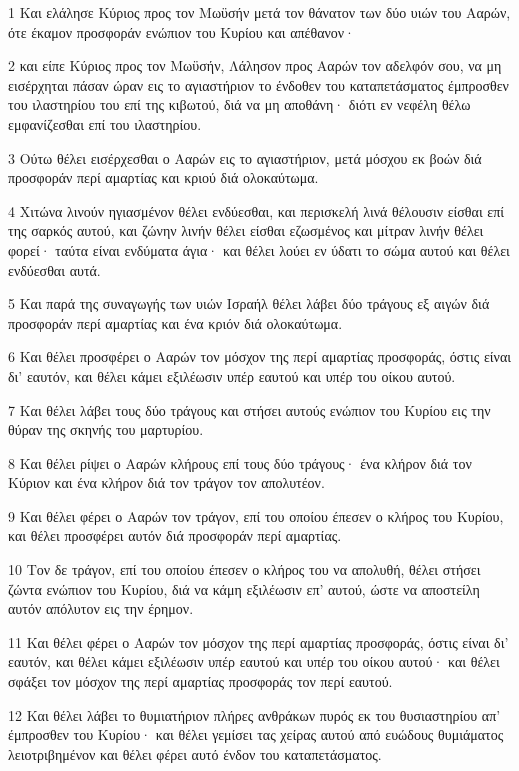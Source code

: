 \par 1 Και ελάλησε Κύριος προς τον Μωϋσήν μετά τον θάνατον των δύο υιών του Ααρών, ότε έκαμον προσφοράν ενώπιον του Κυρίου και απέθανον·
\par 2 και είπε Κύριος προς τον Μωϋσήν, Λάλησον προς Ααρών τον αδελφόν σου, να μη εισέρχηται πάσαν ώραν εις το αγιαστήριον το ένδοθεν του καταπετάσματος έμπροσθεν του ιλαστηρίου του επί της κιβωτού, διά να μη αποθάνη· διότι εν νεφέλη θέλω εμφανίζεσθαι επί του ιλαστηρίου.
\par 3 Ούτω θέλει εισέρχεσθαι ο Ααρών εις το αγιαστήριον, μετά μόσχου εκ βοών διά προσφοράν περί αμαρτίας και κριού διά ολοκαύτωμα.
\par 4 Χιτώνα λινούν ηγιασμένον θέλει ενδύεσθαι, και περισκελή λινά θέλουσιν είσθαι επί της σαρκός αυτού, και ζώνην λινήν θέλει είσθαι εζωσμένος και μίτραν λινήν θέλει φορεί· ταύτα είναι ενδύματα άγια· και θέλει λούει εν ύδατι το σώμα αυτού και θέλει ενδύεσθαι αυτά.
\par 5 Και παρά της συναγωγής των υιών Ισραήλ θέλει λάβει δύο τράγους εξ αιγών διά προσφοράν περί αμαρτίας και ένα κριόν διά ολοκαύτωμα.
\par 6 Και θέλει προσφέρει ο Ααρών τον μόσχον της περί αμαρτίας προσφοράς, όστις είναι δι' εαυτόν, και θέλει κάμει εξιλέωσιν υπέρ εαυτού και υπέρ του οίκου αυτού.
\par 7 Και θέλει λάβει τους δύο τράγους και στήσει αυτούς ενώπιον του Κυρίου εις την θύραν της σκηνής του μαρτυρίου.
\par 8 Και θέλει ρίψει ο Ααρών κλήρους επί τους δύο τράγους· ένα κλήρον διά τον Κύριον και ένα κλήρον διά τον τράγον τον απολυτέον.
\par 9 Και θέλει φέρει ο Ααρών τον τράγον, επί του οποίου έπεσεν ο κλήρος του Κυρίου, και θέλει προσφέρει αυτόν διά προσφοράν περί αμαρτίας.
\par 10 Τον δε τράγον, επί του οποίου έπεσεν ο κλήρος του να απολυθή, θέλει στήσει ζώντα ενώπιον του Κυρίου, διά να κάμη εξιλέωσιν επ' αυτού, ώστε να αποστείλη αυτόν απόλυτον εις την έρημον.
\par 11 Και θέλει φέρει ο Ααρών τον μόσχον της περί αμαρτίας προσφοράς, όστις είναι δι' εαυτόν, και θέλει κάμει εξιλέωσιν υπέρ εαυτού και υπέρ του οίκου αυτού· και θέλει σφάξει τον μόσχον της περί αμαρτίας προσφοράς τον περί εαυτού.
\par 12 Και θέλει λάβει το θυμιατήριον πλήρες ανθράκων πυρός εκ του θυσιαστηρίου απ' έμπροσθεν του Κυρίου· και θέλει γεμίσει τας χείρας αυτού από ευώδους θυμιάματος λειοτριβημένον και θέλει φέρει αυτό ένδον του καταπετάσματος.
